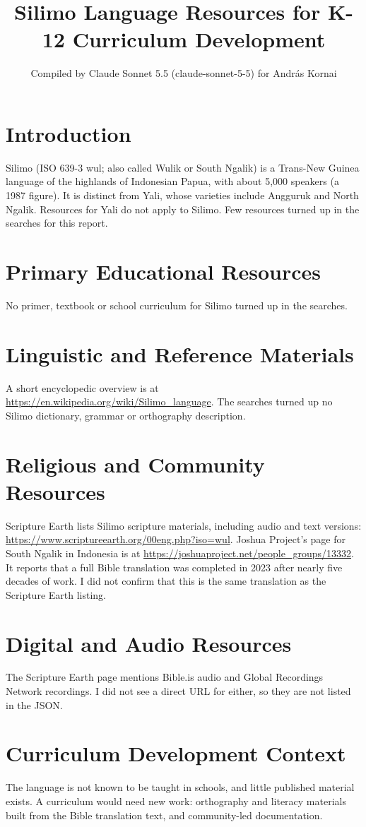\documentclass[12pt]{article}
\title{Silimo Language Resources for K-12 Curriculum Development}
\author{Compiled by Claude Sonnet 5.5 (claude-sonnet-5-5) for Andr\'as Kornai}
\date{}
\begin{document}
\maketitle

\section{Introduction}
Silimo (ISO 639-3 wul; also called Wulik or South Ngalik) is a Trans-New Guinea language of the highlands of Indonesian Papua, with about 5,000 speakers (a 1987 figure). It is distinct from Yali, whose varieties include Angguruk and North Ngalik. Resources for Yali do not apply to Silimo. Few resources turned up in the searches for this report.

\section{Primary Educational Resources}
No primer, textbook or school curriculum for Silimo turned up in the searches.

\section{Linguistic and Reference Materials}
A short encyclopedic overview is at \url{https://en.wikipedia.org/wiki/Silimo_language}. The searches turned up no Silimo dictionary, grammar or orthography description.

\section{Religious and Community Resources}
Scripture Earth lists Silimo scripture materials, including audio and text versions: \url{https://www.scriptureearth.org/00eng.php?iso=wul}. Joshua Project's page for South Ngalik in Indonesia is at \url{https://joshuaproject.net/people_groups/13332}. It reports that a full Bible translation was completed in 2023 after nearly five decades of work. I did not confirm that this is the same translation as the Scripture Earth listing.

\section{Digital and Audio Resources}
The Scripture Earth page mentions Bible.is audio and Global Recordings Network recordings. I did not see a direct URL for either, so they are not listed in the JSON.

\section{Curriculum Development Context}
The language is not known to be taught in schools, and little published material exists. A curriculum would need new work: orthography and literacy materials built from the Bible translation text, and community-led documentation.
\end{document}
